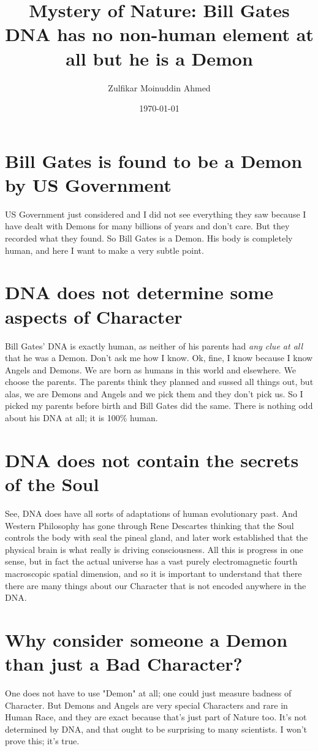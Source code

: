 \documentclass{amsart}
\title{Mystery of Nature:  Bill Gates DNA has no non-human element at all but he is a Demon}
\author{Zulfikar Moinuddin Ahmed}
\date{\today}
\begin{document}
\maketitle

\section{Bill Gates is found to be a Demon by US Government}

US Government just considered and I did not see everything they saw because I have dealt with Demons for many billions of years and don't care.  But they recorded what they found.  So Bill Gates is a Demon.  His body is completely human, and here I want to make a very subtle point.

\section{DNA does not determine some aspects of Character}

Bill Gates' DNA is exactly human, as neither of his parents had {\em any clue at all} that he was a Demon.  Don't ask me how I know.  Ok, fine, I know because I know Angels and Demons.  We are born as humans in this world and elsewhere.  We choose the parents.  The parents think they planned and sussed all things out, but alas, we are Demons and Angels and we pick them and they don't pick us.  So I picked my parents before birth and Bill Gates did the same.  There is nothing odd about his DNA at all; it is 100\% human. 

\section{DNA does not contain the secrets of the Soul}

See, DNA does have all sorts of adaptations of human evolutionary past.  And Western Philosophy has gone through Rene Descartes thinking that the Soul controls the body with seal the pineal gland, and later work established that the physical brain is what really is driving consciousness.  All this is progress in one sense, but in fact the actual universe has a vast purely electromagnetic fourth macroscopic spatial dimension, and so it is important to understand that there there are many things about our Character that is not encoded anywhere in the DNA.  

\section{Why consider someone a Demon than just a Bad Character?}

One does not have to use "Demon" at all; one could just measure badness of Character.  But Demons and Angels are very special Characters and rare in Human Race, and they are exact because that's just part of Nature too.  It's not determined by DNA, and that ought to be surprising to many scientists.  I won't prove this; it's true.  
\end{document}
